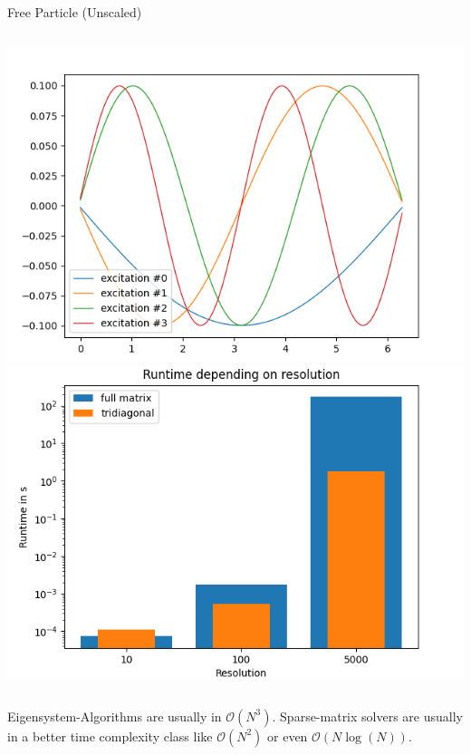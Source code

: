 \begin{frame}{Free Particle (Unscaled)}
%
\begin{columns}
\includegraphics[width=\linewidth]{./gfx/04-free-particle-success}
%
\includegraphics[width=\linewidth]{./gfx/04-free-particle-runtime}
\end{columns}
%
\begin{hintbox}
\footnotesize
Eigensystem-Algorithms are usually in $\mathcal{O}(N^3)$. Sparse-matrix solvers are usually in a better time complexity class like $\mathcal{O}(N^2)$ or even $\mathcal{O}(N \log(N))$.
\end{hintbox}
%
\end{frame}


